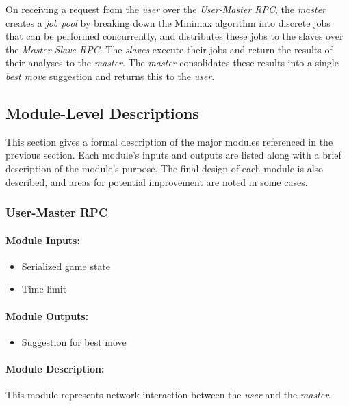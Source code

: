 \documentclass[pdftex,12pt,a4paper]{article}
\begin{document}
On receiving a request from the \emph{user} over the \emph{User-Master RPC}, the \emph{master} creates a \emph{job pool} by breaking down the Minimax algorithm into discrete jobs that can be performed concurrently, and distributes these jobs to the slaves over the \emph{Master-Slave RPC}. The \emph{slaves} execute their jobs and return the results of their analyses to the \emph{master}. The \emph{master} consolidates these results into a single \emph{best move} suggestion and returns this to the \emph{user}.


%
%
\subsection{Module-Level Descriptions}\label{sec:modules}

This section gives a formal description of the major modules referenced in the previous section. Each module's inputs and outputs are listed along with a brief description of the module's purpose. The final design of each module is also described, and areas for potential improvement are noted in some cases.

\subsubsection{User-Master RPC}

\paragraph{Module Inputs:}
\begin{itemize}
\item Serialized game state
\item Time limit
\end{itemize}

\paragraph{Module Outputs:}
\begin{itemize}
\item Suggestion for best move
\end{itemize}

\paragraph{Module Description:\\}
This module represents network interaction between the \emph{user} and the \emph{master}.
\end{document}
